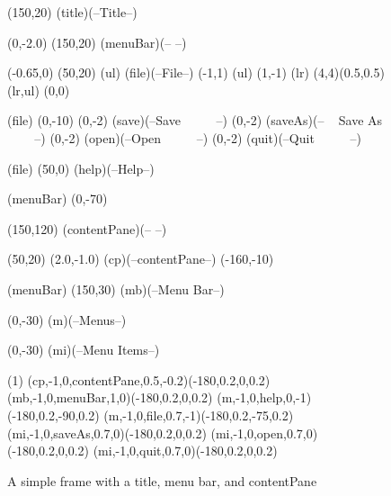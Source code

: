 

\begin {figure}

\Draw


\MinNodeSize(150,20)
\RectNode(title)(--Title--)

\MoveToExit(0,-2.0)
\MinNodeSize(150,20)
\RectNode(menuBar)(-- --)

\MoveToExit(-0.65,0)
\MinNodeSize (50,20)
\MarkLoc(ul)
\RectNode(file)(--File--)
\MoveToExit (-1,1)  \MarkLoc(ul)
\MoveToExit (1,-1)  \MarkLoc(lr)
\SetBrush(4,4){\PaintRect(0.5,0.5)}
\CSeg \PaintRect(lr,ul)
\SetBrush(0,0){ }

\MoveToLoc(file) \Move(0,-10)
\MoveToExit(0,-2) \Node(save)(--Save ~ ~ ~ --)
\MoveToExit(0,-2) \Node(saveAs)(-- ~ Save As ~ ~ ~--)
\MoveToExit(0,-2) \Node(open)(--Open ~ ~ ~ --)
\MoveToExit(0,-2) \Node(quit)(--Quit ~ ~ ~ --)

\MoveToLoc(file) \Move (50,0)
\RectNode(help)(--Help--)


\MoveToLoc(menuBar) \Move(0,-70)

\MinNodeSize(150,120)
\RectNode(contentPane)(-- --)

\MinNodeSize(50,20)
\MoveToExit(2.0,-1.0)
\Node(cp)(--contentPane--)
\Move(-160,-10)

\MoveToLoc(menuBar)
\Move (150,30)   
\Node(mb)(--Menu Bar--)

\Move (0,-30)
\Node(m)(--Menus--)

\Move (0,-30)
\Node(mi)(--Menu Items--)


\ArrowHeads(1)
\CurvedEdgeAt(cp,-1,0,contentPane,0.5,-0.2)(-180,0.2,0,0.2)
\CurvedEdgeAt(mb,-1,0,menuBar,1,0)(-180,0.2,0,0.2)
\CurvedEdgeAt(m,-1,0,help,0,-1)(-180,0.2,-90,0.2)
\CurvedEdgeAt(m,-1,0,file,0.7,-1)(-180,0.2,-75,0.2)
\CurvedEdgeAt(mi,-1,0,saveAs,0.7,0)(-180,0.2,0,0.2)
\CurvedEdgeAt(mi,-1,0,open,0.7,0)(-180,0.2,0,0.2)
\CurvedEdgeAt(mi,-1,0,quit,0.7,0)(-180,0.2,0,0.2)


\EndDraw


\caption {A simple frame with a title, menu bar, and contentPane}

\label {fig:menuBar}

\end {figure}

